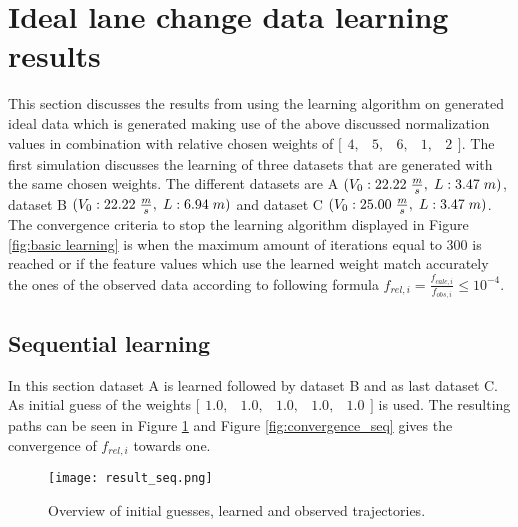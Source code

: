 \section{Ideal lane change data learning results} \label{s:ID_results}
This section discusses the results from using the learning algorithm on generated ideal data which is generated making use of the above discussed normalization values in combination with relative chosen weights of $ \bigl[ \begin{smallmatrix} 4,&5,&6,&1,&2\end{smallmatrix}\bigr]$. The first simulation discusses the learning of three datasets that are generated with the same chosen weights. The different datasets are A $(V_0:22.22\hspace{1mm}\frac{m}{s},\hspace{1mm} L:3.47\hspace{1mm}m)$, dataset B $(V_0:22.22\hspace{1mm}\frac{m}{s},\hspace{1mm} L:6.94\hspace{1mm}m)$ and dataset C $(V_0:25.00\hspace{1mm}\frac{m}{s},\hspace{1mm} L:3.47\hspace{1mm}m)$. The convergence criteria to stop the learning algorithm displayed in Figure \ref{fig:basic learning} is when the maximum amount of iterations equal to $300$ is reached or if the feature values which use the learned weight match accurately the ones of the observed data according to following formula $f_{rel,i} = \frac{f_{calc,i}}{f_{obs,i}} \leq 10^{-4}$.

\subsection{Sequential learning}
In this section dataset A is learned followed by dataset B and as last dataset C.
As initial guess of the weights $\bigl[ \begin{smallmatrix} 1.0,&1.0,&1.0,&1.0,&1.0\end{smallmatrix}\bigr]$ is used.  The resulting paths can be seen in Figure \ref{fig:result_seq} and Figure \ref{fig:convergence_seq} gives the convergence of $f_{rel,i}$ towards one.\\

\begin{figure}[h!]
	\centering
	\texttt{[image: result\_seq.png]}
	\caption{Overview of initial guesses, learned and observed trajectories.} 
	\label{fig:result_seq}
\end{figure}

